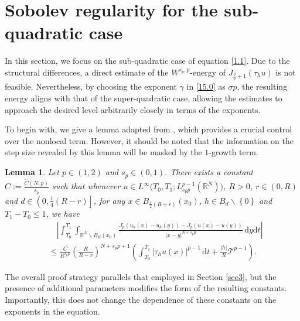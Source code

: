 \documentclass[reqno,10pt]{amsart}
\numberwithin{equation}{section}
\newtheorem{lemma}[theorem]{Lemma}
\begin{document}
\section{Sobolev regularity  for the sub-quadratic case}
\label{sec4}
In this section, we focus on the sub-quadratic case of equation \eqref{1.1}. Due to the structural differences, a direct estimate of the $W^{s_p,p}$-energy of $J_{\frac{q}{p}+1}(\tau_hu)$ is not feasible. Nevertheless, by choosing the exponent $\gamma$ in \eqref{15.0} as $\sigma p$, the resulting energy aligns with that of the super-quadratic case, allowing the estimates to approach the desired level arbitrarily closely in terms of the exponents.

To begin with, we give a lemma adapted from \cite[Lemma 3.2]{BDL2401}, which provides a crucial control over the nonlocal term. However, it should be noted that the information on the step size revealed by this lemma will be masked by the $1$-growth term.

\begin{lemma}
	\label{lem17}
	Let $p\in(1, 2)$ and $s_p\in(0, 1)$. There exists a constant $C:=\frac{\widetilde{C}(N,p)}{s_p}$ such that whenever $u\in L^\infty\bigl( T_0,T_1;L^{p-1}_{s_pp}(\mathbb{R}^N)\bigl)$, $R>0$, $r\in(0,R)$ and $d\in \left( 0,\frac{1}{4}(R-r)\right] $, for any $x\in B_{\frac{1}{2}(R+r)}(x_0)$, $h\in B_d\backslash \left\lbrace 0\right\rbrace $ and $T_1-T_0\le1$, we have
	\begin{align*}
		&\quad\left| \int_{T_0}^{T_1}\int_{\mathbb{R}^N\backslash B_R(x_0)}\frac{J_p\left( u_h(x)-u_h(y)\right)-J_p\left( u(x)-u(y)\right) }{|x-y|^{N+s_pp}}\,\mathrm{d}y\mathrm{d}t\right|\\
		&\le \frac{C}{R^{s_pp}}\left( \frac{R}{R-r}\right)^{N+s_pp+1}\left( \int_{T_0}^{T_1}|\tau_hu(x)|^{p-1}\,\mathrm{d}t+\frac{|h|}{R}\mathcal{T}^{p-1}\right).
	\end{align*}
\end{lemma}

The overall proof strategy parallels that employed in Section \ref{sec3}, but the presence of additional parameters modifies the form of the resulting constants. Importantly, this does not change the dependence of these constants on the exponents in the equation.
\end{document}
